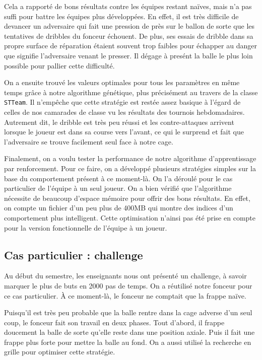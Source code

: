 \documentclass[12pt,a4paper]{article}
\begin{document}
Cela a rapport\'e de bons r\'esultats contre les \'equipes restant 
na\"ives, mais n'a pas suffi pour battre les \'equipes plus d\'evelopp\'ees. 
En effet, il est tr\`es difficile de devancer un adversaire qui fait une 
pression de pr\`es sur le ballon de sorte que les tentatives de 
dribbles du fonceur \'echouent.
De plus, ses essais de dribble dans sa propre surface de r\'eparation 
\'etaient souvent trop faibles pour \'echapper au danger que signifie 
l'adversaire venant le presser. Il d\'egage \`a pres\'ent la balle le plus loin 
possible pour pallier cette difficult\'e.

On a ensuite trouv\'e les valeurs optimales pour tous les param\`etres en 
m\^eme temps gr\^ace \`a notre algorithme g\'en\'etique, plus pr\'ecis\'ement 
au travers de la classe \texttt{STTeam}.
Il n'emp\^eche que cette strat\'egie est rest\'ee assez basique \`a l'\'egard 
de celles de nos camarades de classe vu les r\'esultats des tournois 
hebdomadaires. 
Autrement dit, le dribble est tr\`es peu r\'eussi et les contre-attaques 
arrivent lorsque le joueur est dans sa course vers l'avant, ce qui le surprend 
et fait que l'adversaire se trouve facilement seul face \`a notre cage.

Finalement, on a voulu tester la performance de notre algorithme 
d'apprentissage par renforcement. Pour ce faire, on a d\'evelopp\'e plusieurs 
strat\'egies simples sur la base du comportement pr\'esent \`a ce moment-l\`a.
On l'a d\'eroul\'e pour le cas particulier de l'\'equipe \`a un seul joueur. On 
a bien v\'erifi\'e que l'algorithme n\'ecessite de beaucoup d'espace m\'emoire 
pour offrir des bons r\'esultats. En effet, on compte un fichier d'un peu plus 
de 400MB qui montre des indices d'un comportement plus intelligent. Cette 
optimisation n'ainsi pas \'et\'e prise en compte pour la version fonctionnelle 
de l'\'equipe \`a un joueur.

\subsection*{Cas particulier : challenge}
Au d\'ebut du semestre, les enseignants nous ont pr\'esent\'e un challenge, \`a 
savoir marquer le plus de buts en 2000 pas de temps. On a r\'eutilis\'e notre 
fonceur pour ce cas particulier. \`A ce moment-l\`a, le fonceur ne comptait que 
la frappe na\"ive. 

Puisqu'il est tr\`es peu probable que la balle rentre dans 
la cage adverse d'un seul coup, le fonceur fait son travail en deux phases. 
Tout d'abord, il frappe doucement la balle de sorte qu'elle reste dans une 
position axiale. Puis il fait une frappe plus forte pour mettre la balle au 
fond. On a aussi utilis\'e la recherche en grille pour optimiser cette 
strat\'egie. 
\end{document}
